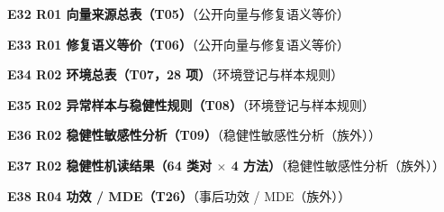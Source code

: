 \documentclass[UTF8,fontset=fandol,11pt,a4paper]{ctexart}
\begin{document}
\begin{samepage}\noindent\textbf{E32 R01 向量来源总表（T05）}（公开向量与修复语义等价）\par\noindent {}\par\vspace{1.5mm}\end{samepage}
\begin{samepage}\noindent\textbf{E33 R01 修复语义等价（T06）}（公开向量与修复语义等价）\par\noindent {}\par\vspace{1.5mm}\end{samepage}
\begin{samepage}\noindent\textbf{E34 R02 环境总表（T07，28 项）}（环境登记与样本规则）\par\noindent {}\par\vspace{1.5mm}\end{samepage}
\begin{samepage}\noindent\textbf{E35 R02 异常样本与稳健性规则（T08）}（环境登记与样本规则）\par\noindent {}\par\vspace{1.5mm}\end{samepage}
\begin{samepage}\noindent\textbf{E36 R02 稳健性敏感性分析（T09）}（稳健性敏感性分析（族外））\par\noindent {}\par\vspace{1.5mm}\end{samepage}
\begin{samepage}\noindent\textbf{E37 R02 稳健性机读结果（64 类对 \texorpdfstring{$\times$}{x} 4 方法）}（稳健性敏感性分析（族外））\par\noindent {}\par\vspace{1.5mm}\end{samepage}
\begin{samepage}\noindent\textbf{E38 R04 功效 / MDE（T26）}（事后功效 / MDE（族外））\par\noindent {}\par\vspace{1.5mm}\end{samepage}
\end{document}
